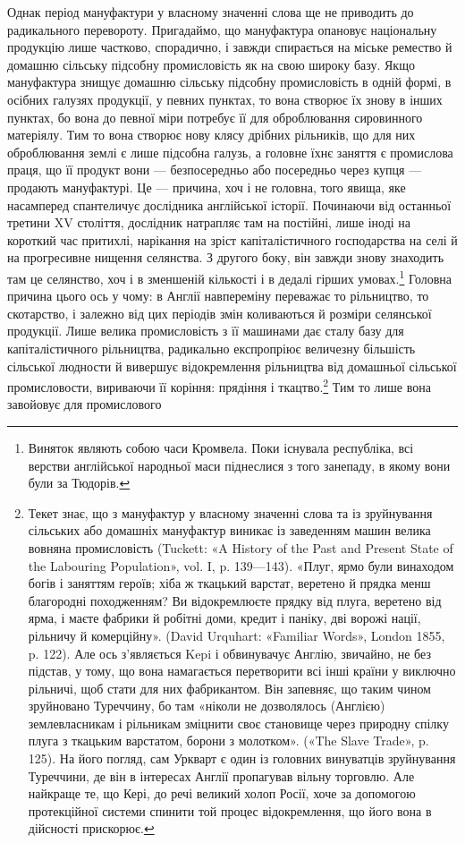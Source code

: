 Однак період мануфактури у власному значенні слова ще не
приводить до радикального перевороту. Пригадаймо, що мануфактура
опановує національну продукцію лише частково, спорадично,
і завжди спирається на міське ремество й домашню
сільську підсобну промисловість як на свою широку базу.
Якщо мануфактура знищує домашню сільську підсобну промисловість
в одній формі, в осібних галузях продукції, у певних
пунктах, то вона створює їх знову в інших пунктах, бо вона до
певної міри потребує її для оброблювання сировинного матеріялу.
Тим то вона створює нову клясу дрібних рільників, що для них
оброблювання землі є лише підсобна галузь, а головне їхнє заняття
є промислова праця, що її продукт вони — безпосередньо
або посередньо через купця — продають мануфактурі. Це —
причина, хоч і не головна, того явища, яке насамперед спантеличує
дослідника англійської історії. Починаючи від останньої
третини XV століття, дослідник натрапляє там на постійні,
лише іноді на короткий час притихлі, нарікання на зріст капіталістичного
господарства на селі й на прогресивне нищення
селянства. З другого боку, він завжди знову знаходить там це
селянство, хоч і в зменшеній кількості і в дедалі гірших умовах.\footnote{
Виняток являють собою часи Кромвела. Поки існувала республіка,
всі верстви англійської народньої маси піднеслися з того занепаду,
в якому вони були за Тюдорів.
}
Головна причина цього ось у чому: в Англії навпереміну переважає
то рільництво, то скотарство, і залежно від цих періодів
змін коливаються й розміри селянської продукції. Лише велика
промисловість з її машинами дає сталу базу для капіталістичного
рільництва, радикально експропріює величезну більшість сільської
людности й вивершує відокремлення рільництва від домашньої
сільської промисловости, вириваючи її коріння: прядіння
і ткацтво.\footnote{
Текет знає, що з мануфактур у власному значенні слова та із
зруйнування сільських або домашніх мануфактур виникає із заведенням
машин велика вовняна промисловість (Tuckett: «A History of the Past
and Present State of the Labouring Population», vol. I, p. 139—143).
«Плуг, ярмо були винаходом богів і заняттям героїв; хіба ж ткацький
варстат, веретено й прядка менш благородні походженням? Ви відокремлюєте
прядку від плуга, веретено від ярма, і маєте фабрики й робітні
доми, кредит і паніку, дві ворожі нації, рільничу й комерційну».
(David Urquhart: «Familiar Words», London 1855, p. 122). Але ось з’являється
Kepi і обвинувачує Англію, звичайно, не без підстав, у тому,
що вона намагається перетворити всі інші країни у виключно рільничі,
щоб стати для них фабрикантом. Він запевняє, що таким чином зруйновано
Туреччину, бо там «ніколи не дозволялось (Англією) землевласникам
і рільникам зміцнити своє становище через природну спілку плуга
з ткацьким варстатом, борони з молотком». («The Slave Trade», p. 125).
На його погляд, сам Уркварт є один із головних винуватців зруйнування
Туреччини, де він в інтересах Англії пропагував вільну торговлю.
Але найкраще те, що Кері, до речі великий холоп Росії, хоче за допомогою
протекційної системи спинити той процес відокремлення, що його вона
в дійсності прискорює.
} Тим то лише вона завойовує для промислового
